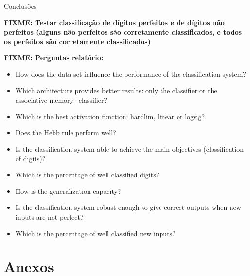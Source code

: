 \documentclass{article}
\begin{document}
Conclusões

\textbf{FIXME: Testar classificação de dígitos perfeitos e de dígitos não perfeitos (alguns não perfeitos são corretamente classificados, e todos os perfeitos são corretamente classificados)}


\vspace{.3cm}

\textbf{FIXME: Perguntas relatório:}

\begin{itemize}
\item How does the data set influence the performance of the classification system?

\item Which architecture provides better results: only the classifier or the associative memory+classifier?

\item Which is the best activation function: hardlim, linear or logsig?

\item Does the Hebb rule perform well?

\item Is the classification system able to achieve the main objectives (classification of digits)?

\item Which is the percentage of well classified digits?

\item How is the generalization capacity?

\item Is the classification system robust enough to give correct outputs when new inputs are not perfect?

\item Which is the percentage of well classified new inputs?
\end{itemize}

\pagebreak

\section{Anexos}
\end{document}
